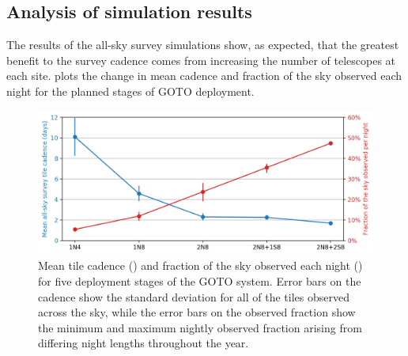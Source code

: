 
\subsection{Analysis of simulation results}
\label{sec:survey_sim_analysis}
\begin{colsection}

The results of the all-sky survey simulations show, as expected, that the greatest benefit to the survey cadence comes from increasing the number of telescopes at each site.  plots the change in mean cadence and fraction of the sky observed each night for the planned stages of GOTO deployment.

\begin{figure}[t]
    \begin{center}
        \includegraphics[width=\linewidth]{images/survey_sims/results.png}
    \end{center}
    \caption[Tile cadence and nightly sky observation for different GOTO systems]{
        Mean tile cadence () and fraction of the sky observed each night () for five deployment stages of the GOTO system. Error bars on the cadence show the standard deviation for all of the tiles observed across the sky, while the error bars on the observed fraction show the minimum and maximum nightly observed fraction arising from differing night lengths throughout the year.
    }\label{fig:survey_sim_results}
\end{figure}


\end{colsection}
